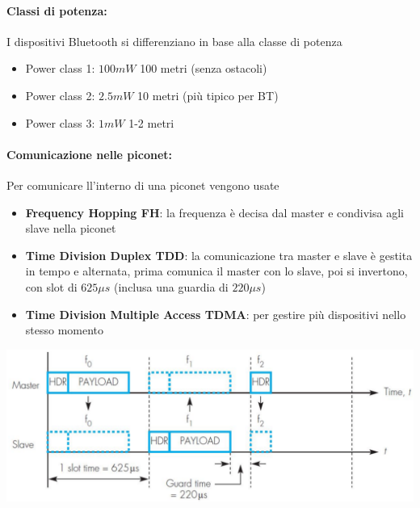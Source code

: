 \paragraph{Classi di potenza:} I dispositivi Bluetooth si differenziano in base alla classe di potenza
\begin{itemize}
	\item Power class 1: $100 mW$ 100 metri (senza ostacoli)

	\item Power class 2: $2.5 mW$ 10 metri (più tipico per BT)

	\item Power class 3: $1 mW$ 1-2 metri
\end{itemize}

\paragraph{Comunicazione nelle piconet:} Per comunicare ll'interno di una piconet vengono usate
\begin{itemize}
	\item \textbf{Frequency Hopping FH}: la frequenza è decisa dal master e condivisa agli slave nella piconet

	\item \textbf{Time Division Duplex TDD}: la comunicazione tra master e slave è gestita in tempo e alternata, prima comunica il master con lo slave, poi si invertono, con slot di $625\mu s$ (inclusa una guardia di $220 \mu s$)

	\item \textbf{Time Division Multiple Access TDMA}: per gestire più dispositivi nello stesso momento
\end{itemize}
\begin{center}
	\includegraphics[width=0.9\linewidth]{img/wpan/picocomm}
\end{center}


